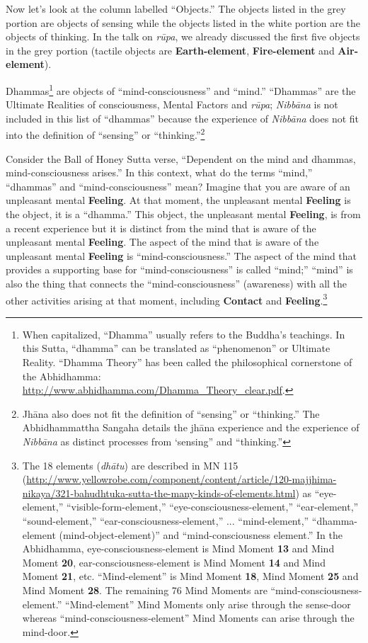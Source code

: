 Now let’s look at the column labelled “Objects.” The objects listed in the grey portion are objects of sensing while the objects listed in the white portion are the objects of thinking. In the talk on \textit{rūpa}, we already discussed the first five objects in the grey portion (tactile objects are \textbf{Earth-element}, \textbf{Fire-element} and \textbf{Air-element}).

Dhammas\footnote{When capitalized, “Dhamma” usually refers to the Buddha’s teachings. In this Sutta, “dhamma” can be translated as “phenomenon” or Ultimate Reality. “Dhamma Theory” has been called the philosophical cornerstone of the Abhidhamma: \url{http://www.abhidhamma.com/Dhamma_Theory_clear.pdf}.} are objects of “mind-consciousness” and “mind.” “Dhammas” are the Ultimate Realities of consciousness, Mental Factors and \textit{rūpa}; \textit{Nibbāna} is not included in this list of “dhammas” because the experience of \textit{Nibbāna} does not fit into the definition of “sensing” or “thinking.”\footnote{Jhāna also does not fit the definition of “sensing” or “thinking.” The Abhidhammattha Sangaha details the jhāna experience and the experience of \textit{Nibbāna} as distinct processes from `sensing” and “thinking.”}

Consider the Ball of Honey Sutta verse, “Dependent on the mind and dhammas, mind-consciousness arises.” In this context, what do the terms “mind,” “dhammas” and “mind-consciousness” mean? Imagine that you are aware of an unpleasant mental \textbf{Feeling}. At that moment, the unpleasant mental \textbf{Feeling} is the object, it is a “dhamma.” This object, the unpleasant mental \textbf{Feeling}, is from a recent experience but it is distinct from the mind that is aware of the unpleasant mental \textbf{Feeling}. The aspect of the mind that is aware of the unpleasant mental \textbf{Feeling} is “mind-consciousness.” The aspect of the mind that provides a supporting base for “mind-consciousness” is called “mind;” “mind” is also the thing that connects the “mind-consciousness” (awareness) with all the other activities arising at that moment, including \textbf{Contact} and \textbf{Feeling}.\footnote{The 18 elements (\textit{dhātu}) are described in MN 115 (\url{http://www.yellowrobe.com/component/content/article/120-majjhima-nikaya/321-bahudhtuka-sutta-the-many-kinds-of-elements.html}) as “eye-element,” “visible-form-element,” “eye-consciousness-element,” “ear-element,” “sound-element,” “ear-consciousness-element,” ... “mind-element,” “dhamma-element (mind-object-element)” and “mind-consciousness element.” In the Abhidhamma, eye-consciousness-element is Mind Moment \textbf{13} and Mind Moment \textbf{20}, ear-consciousness-element is Mind Moment \textbf{14} and Mind Moment \textbf{21}, etc. “Mind-element” is Mind Moment \textbf{18}, Mind Moment \textbf{25} and Mind Moment \textbf{28}. The remaining 76 Mind Moments are “mind-consciousness-element.” “Mind-element” Mind Moments only arise through the sense-door whereas “mind-consciousness-element” Mind Moments can arise through the mind-door.}

